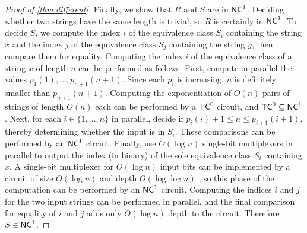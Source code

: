 \begin{proof}[Proof of \autoref{thm:different}]
  Finally, we show that $R$ and $S$ are in ${\mathsf{NC}}^1$.
  Deciding whether two strings have the same length is trivial, so $R$ is certainly in ${\mathsf{NC}}^1$.
  To decide $S$, we compute the index $i$ of the equivalence class $S_i$ containing the string $x$ and the index $j$ of the equivalence class $S_j$ containing the string $y$, then compare them for equality.
  Computing the index $i$ of the equivalence class of a string $x$ of length $n$ can be performed as follows.
  First, compute in parallel the values $p_1(1), \dotsc, p_{n + 1}(n + 1)$.
  Since each $p_i$ is increasing, $n$ is definitely smaller than $p_{n + 1}(n + 1)$.
  Computing the exponentiation of $O(n)$ pairs of strings of length $O(n)$ each can be performed by a ${\mathsf{TC}}^0$ circuit, and ${\mathsf{TC}}^0 \subseteq {\ensuremath{\mathsf{NC}}}^1$.
  Next, for each $i \in \{1, \dotsc, n\}$ in parallel, decide if $p_i(i) + 1 \leq n \leq p_{i + 1}(i + 1)$, thereby determining whether the input is in $S_i$.
  These comparisons can be performed by an ${\mathsf{NC}}^1$ circuit.
  Finally, use $O(\log n)$ single-bit multiplexers in parallel to output the index (in binary) of the sole equivalence class $S_i$ containing $x$.
  A single-bit multiplexer for $O(\log n)$ input bits can be implemented by a circuit of size $O(\log n)$ and depth $O(\log \log n)$ \autocite[Lemma~2.5.5]{savage98}, so this phase of the computation can be performed by an ${\mathsf{NC}}^1$ circuit.
  Computing the indices $i$ and $j$ for the two input strings can be performed in parallel, and the final comparison for equality of $i$ and $j$ adds only $O(\log n)$ depth to the circuit.
  Therefore $S \in {\ensuremath{\mathsf{NC}}}^1$.
\end{proof}
